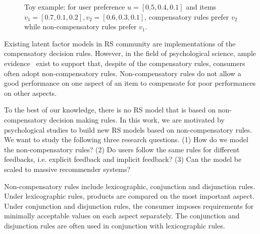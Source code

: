 \documentclass[conference]{IEEEtran}
\begin{document}
\begin{figure}[htbp]
\begin{center}
\caption{Toy example: for user preference $u=[0.5,0.4,0.1]$ and items $v_1=[0.7,0.1,0.2],v_2=[0.6,0.3,0.1]$, compensatory rules prefer $v_2$ while non-compensatory rules prefer $v_1$. }
\label{default}
\end{center}
\end{figure}

Existing latent factor models in RS community are implementations of the compensatory decision rules. However, in the field of psychological science, ample evidence~\cite{Engel1986Consumer} exist to support that, despite of the compensatory rules, consumers often adopt non-compensatory rules. Non-compensatory rules do not allow a good performance on one aspect of an item to compensate for poor performances on other aspects. 



To the best of our knowledge, there is no RS model that is based on non-compensatory decision making rules.
In this work, we are motivated by psychological studies to build new RS models based on non-compensatory rules. We want to study the following three research questions. (1) How do we model the non-compensatory rules? (2) Do users follow the same rules for different feedbacks, i.e. explicit feedback and implicit feedback? (3) Can the model be scaled to massive recommender systems?
  
Non-compensatory rules include lexicographic, conjunction and disjunction rules. Under lexicographic rules, products are compared on the most important aspect. Under conjunction and disjunction rules, the consumer imposes requirements for minimally acceptable values on each aspect separately. The conjunction and disjunction rules are often used in conjunction with lexicographic rules.
  
\end{document}
